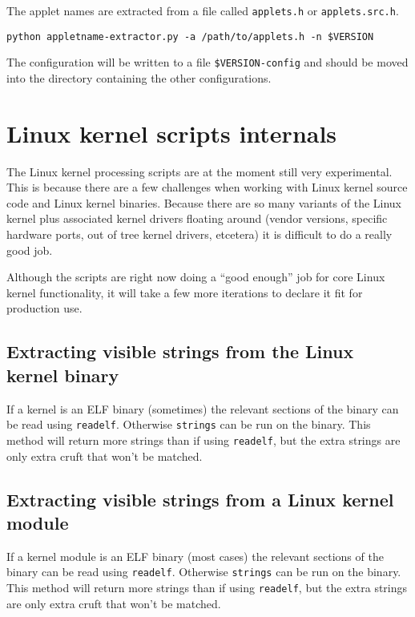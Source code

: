 \documentclass[10pt]{article}
\begin{document}
The applet names are extracted from a file called \texttt{applets.h} or
\texttt{applets.src.h}.

\begin{verbatim}
python appletname-extractor.py -a /path/to/applets.h -n $VERSION
\end{verbatim}

The configuration will be written to a file \texttt{\$VERSION-config} and
should be moved into the directory containing the other configurations.

\section{Linux kernel scripts internals}

The Linux kernel processing scripts are at the moment still very experimental.
This is because there are a few challenges when working with Linux kernel
source code and Linux kernel binaries. Because there are so many variants of
the Linux kernel plus associated kernel drivers floating around (vendor
versions, specific hardware ports, out of tree kernel drivers, etcetera) it is
difficult to do a really good job.

Although the scripts are right now doing a ``good enough'' job for core Linux
kernel functionality, it will take a few more iterations to declare it fit for
production use.

\subsection{Extracting visible strings from the Linux kernel binary}

If a kernel is an ELF binary (sometimes) the relevant sections of the
binary can be read using \texttt{readelf}. Otherwise \texttt{strings} can be
run on the binary. This method will return more strings than if using
\texttt{readelf}, but the extra strings are only extra cruft that won't be
matched.

\subsection{Extracting visible strings from a Linux kernel module}

If a kernel module is an ELF binary (most cases) the relevant sections of the
binary can be read using \texttt{readelf}. Otherwise \texttt{strings} can be
run on the binary. This method will return more strings than if using
\texttt{readelf}, but the extra strings are only extra cruft that won't be
matched.
\end{document}
